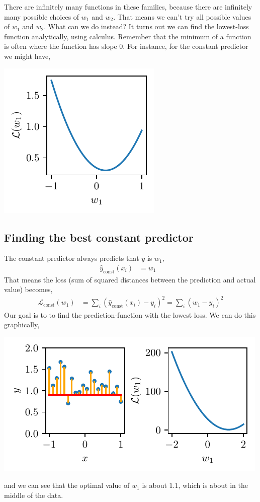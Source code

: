 \documentclass{article}
\newcommand{\yh}{\hat{y}}
\newcommand{\bracket}[3]{\left#1 #3 \right#2}
\renewcommand{\b}{\bracket{(}{)}}
\renewcommand{\L}{\mathcal{L}}
\begin{document}
There are infinitely many functions in these families, because there are infinitely many possible choices of $w_1$ and $w_2$.
That means we can't try all possible values of $w_1$ and $w_2$.
What can we do instead?
It turns out we can find the lowest-loss function analytically, using calculus.
Remember that the minimum of a function is often where the function has slope $0$.
For instance, for the constant predictor we might have,
\begin{center}
  \includegraphics{x2.pdf}
\end{center}

\subsection{Finding the best constant predictor}
The constant predictor always predicts that $y$ is $w_1$,
\begin{align}
  \yh_\text{const}(x_i) &= w_1 & 
\end{align}
That means the loss (sum of squared distances between the prediction and actual value) becomes,
\begin{align}
  \L_\text{const}(w_1) &= \sum_i \b{\yh_\text{const}(x_i) - y_i}^2 =  \sum_i \b{w_1 - y_i}^2
\end{align} 
Our goal is to to find the prediction-function with the lowest loss.
We can do this graphically,
\begin{center}
  \includegraphics{const_obj.pdf}
\end{center}
and we can see that the optimal value of $w_1$ is about $1.1$, which is about in the middle of the data.
\end{document}
